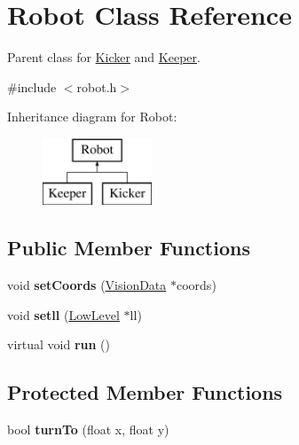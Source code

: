 \hypertarget{class_robot}{\section{Robot Class Reference}
\label{class_robot}
}


Parent class for \hyperlink{class_kicker}{Kicker} and \hyperlink{class_keeper}{Keeper}.  




{\ttfamily \#include $<$robot.\-h$>$}

Inheritance diagram for Robot\-:\begin{figure}[H]
\begin{center}
\leavevmode
\includegraphics[height=2.000000cm]{class_robot}
\end{center}
\end{figure}
\subsection*{Public Member Functions}
\begin{DoxyCompactItemize}
\item 
\hypertarget{class_robot_a429c47eb69e6c59bad569a3cbfdc2883}{void {\bfseries set\-Coords} (\hyperlink{class_vision_data}{Vision\-Data} $\ast$coords)}\label{class_robot_a429c47eb69e6c59bad569a3cbfdc2883}

\item 
\hypertarget{class_robot_a1c8b420008ab591da561136ed9aba045}{void {\bfseries setll} (\hyperlink{class_low_level}{Low\-Level} $\ast$ll)}\label{class_robot_a1c8b420008ab591da561136ed9aba045}

\item 
\hypertarget{class_robot_a00d8702f14f86ba41d2a8c0d466fab2b}{virtual void {\bfseries run} ()}\label{class_robot_a00d8702f14f86ba41d2a8c0d466fab2b}

\end{DoxyCompactItemize}
\subsection*{Protected Member Functions}
\begin{DoxyCompactItemize}
\item 
\hypertarget{class_robot_aef4a71dbb88fdffcfd01037382e5ebf9}{bool {\bfseries turn\-To} (float x, float y)}\label{class_robot_aef4a71dbb88fdffcfd01037382e5ebf9}

\end{DoxyCompactItemize}

